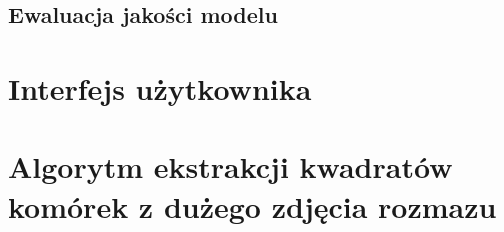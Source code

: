 


\subsection{Ewaluacja jakości modelu}


\section{Interfejs użytkownika}

\section{Algorytm ekstrakcji kwadratów komórek z dużego zdjęcia rozmazu}\label{sec:kwadraty}